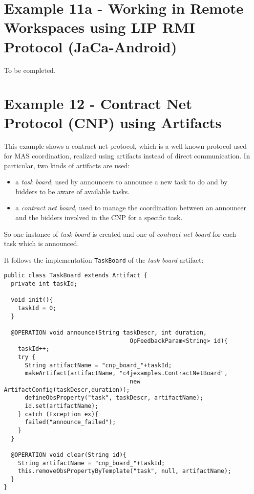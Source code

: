 \documentclass[11pt]{report}
\newcommand\code[1]{{\small{\mbox{\texttt{{#1}}}}}}
\begin{document}

\newpage
\section{Example 11a - Working in Remote Workspaces using LIP RMI Protocol (JaCa-Android)}

To be completed.


\newpage
\section{Example 12 - Contract Net Protocol (CNP) using Artifacts}

This example shows  a contract net protocol, which is a well-known protocol used for MAS coordination, realized using artifacts instead of direct communication.
%
In particular, two kinds of artifacts are used:
%
\begin{itemize}
\item a \emph{task board}, used by announcers to announce a new task to do and by bidders to be aware of available tasks.
% 
\item a \emph{contract net board}, used to manage the coordination between an announcer  and the bidders involved in the CNP for a specific task.
%
\end{itemize}
%
So one instance of \emph{task board} is created and one of \emph{contract net board} for each task which is announced.

\medskip
%
\noindent It follows the implementation \code{TaskBoard} of the \emph{task board} artifact:

{\scriptsize{\begin{verbatim}
public class TaskBoard extends Artifact {
  private int taskId;
  
  void init(){
    taskId = 0;
  }

  @OPERATION void announce(String taskDescr, int duration, 
                                    OpFeedbackParam<String> id){
    taskId++;
    try {
      String artifactName = "cnp_board_"+taskId;
      makeArtifact(artifactName, "c4jexamples.ContractNetBoard", 
                                    new ArtifactConfig(taskDescr,duration));
      defineObsProperty("task", taskDescr, artifactName);
      id.set(artifactName);
    } catch (Exception ex){
      failed("announce_failed");
    }   
  }

  @OPERATION void clear(String id){
    String artifactName = "cnp_board_"+taskId;
    this.removeObsPropertyByTemplate("task", null, artifactName);
  }
}
 \end{verbatim}}}
\end{document}
